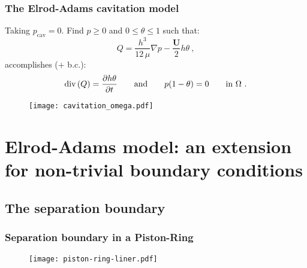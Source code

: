 \documentclass[10pt,aspectratio=169]{beamer}
\begin{document}



\begin{frame}
\frametitle{The Elrod-Adams cavitation model}
\vspace*{1.0cm}
Taking $p_{\text{cav}}=0$. Find $p\geq 0$ and $0\leq \theta \leq 1$ such that: $$Q=\frac{h^3}{12\,\mu} \nabla p - \frac{\mathbf{U}}{2}h\theta~,$$ accomplishes (+ b.c.): $$\text{div} \left( Q \right) =\frac{\partial h\theta }{\partial t}\qquad \mbox{and}\qquad p(1-\theta)=0 \qquad \mbox{in }  \Omega~.$$

\begin{figure}
	\centering
	\texttt{[image: cavitation\_omega.pdf]}
\end{figure}
\end{frame}


\setcounter{showSlideNumbers}{0}
\section{Elrod-Adams model: an extension for non-trivial boundary conditions}
\subsection{The separation boundary}
\begin{frame}[noframenumbering]

\tableofcontents[
currentsection,
currentsubsection,
subsectionstyle=show/shaded/hide
]
\end{frame}
\setcounter{showSlideNumbers}{1}

\begin{frame}
\frametitle{Separation boundary in a Piston-Ring}
\vspace*{1.0cm}
\begin{figure}
	\centering
	\texttt{[image: piston-ring-liner.pdf]}
\end{figure}
\end{frame}
\end{document}
